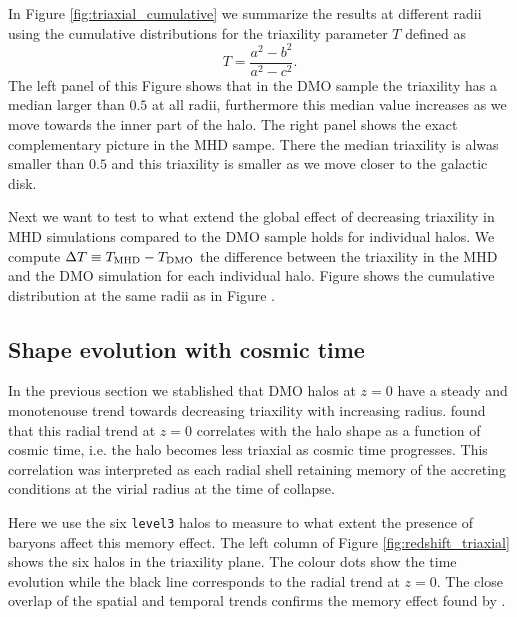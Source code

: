 \documentclass[a4paper,fleqn,usenatbib]{mnras}
\begin{document}
In Figure \ref{fig:triaxial_cumulative} we summarize the results at
different radii using the cumulative distributions for the 
triaxility parameter $T$ defined as 
\begin{equation}
T=\frac{a^2-b^2}{a^2-c^2}.
\label{eq:triaxiality}
\end{equation}
The left panel of this Figure shows that in the DMO sample the
triaxility has a median larger than $0.5$ at all radii, furthermore
this median value increases as we move towards the inner part of the
halo.
The right panel shows the exact complementary picture in the MHD
sampe.
There the median triaxility is alwas smaller than $0.5$ and this
triaxility is smaller as we move closer to the galactic disk.


Next we want to test to what extend the global effect of decreasing
triaxility in MHD simulations compared to the DMO sample 
holds for individual halos. 
We compute $\Delta T\equiv T_{\rm MHD}-T_{\rm DMO}$ the difference between the
triaxility in the MHD and the DMO simulation for each individual halo. 
Figure \label{fig:delta_triaxial_cumulative} shows the cumulative
distribution at the same radii as in
Figure \label{fig:delta_triaxial_cumulative}. 
    





\subsection{Shape evolution with cosmic time}

In the previous section we stablished that DMO halos at $z=0$ have
a steady and monotenouse trend towards decreasing triaxility with
increasing radius.
\cite{Vera-Ciro_et_al._2011} found that this  radial trend at $z=0$ 
correlates with the halo shape as a function of cosmic time, i.e.
the halo becomes less triaxial as cosmic time progresses. 
This correlation was interpreted as each radial shell retaining memory
of the accreting conditions at the virial radius at the time of
collapse.

Here we use the six \texttt{level3} halos to measure to what extent
the presence of baryons affect this memory effect.
The left column of Figure \ref{fig:redshift_triaxial} shows the six
halos in the triaxility plane. 
The colour dots show the time evolution while the black line
corresponds to the radial trend at $z=0$.
The close overlap of the spatial and temporal trends confirms the
memory effect found by \cite{Vera-Ciro_et_al.2011}.
\end{document}
